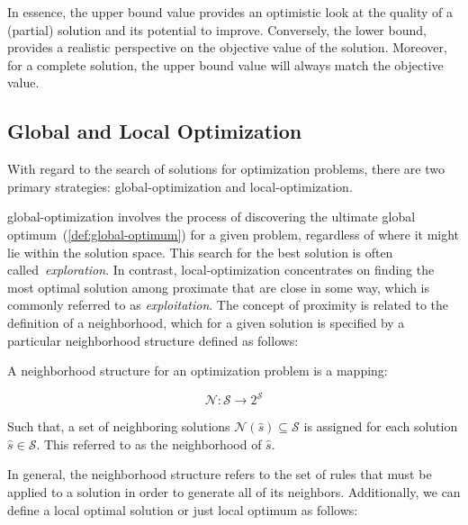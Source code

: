 In essence, the upper bound value provides an optimistic look at the quality of
a (partial) solution and its potential to improve. Conversely, the lower bound,
provides a realistic perspective on the objective value of the solution.
Moreover, for a complete solution, the upper bound value will always match the
objective value.

\subsection{Global and Local Optimization}
\label{subsec:go-and-lo}

With regard to the search of solutions for optimization problems, there are two
primary strategies: \acrfull{global-optimization} and \acrfull{local-optimization}.

\acrshort{global-optimization} involves the process of discovering the ultimate
global optimum~(\ref{def:global-optimum}) for a given problem, regardless of
where it might lie within the solution space. This search for the best solution
is often called~\textit{exploration}. In contrast,
\acrshort{local-optimization} concentrates on finding the most optimal solution
among proximate that are close in some way, which is commonly referred to as
\textit{exploitation}. The concept of proximity is related to the definition
of a neighborhood, which for a given solution is specified by a particular
neighborhood structure defined as follows:

\begin{definition}
  \label{def:neighborhood-structure}

  A neighborhood structure for an optimization problem is a mapping:

  \begin{equation}
    \label{eq:neighborhood-structure}
    \mathcal{N} \colon \mathcal{S} \longrightarrow 2^{\mathcal{S}}
  \end{equation}

  Such that, a set of neighboring solutions $\mathcal{N}(\hat{s}) \subseteq
    \mathcal{S}$ is assigned for each solution $\hat{s} \in \mathcal{S}$. This
  referred to as the neighborhood of $\hat{s}$.
\end{definition}

In general, the neighborhood structure refers to the set of rules that must be
applied to a solution in order to generate all of its neighbors.  Additionally,
we can define a local optimal solution or just local optimum as follows:

